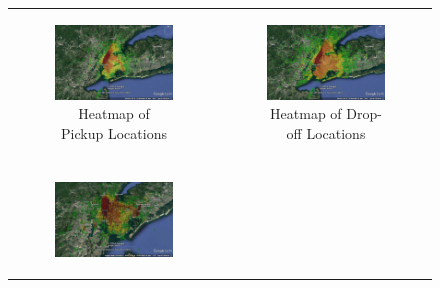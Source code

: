 \documentclass{article}
\begin{document}
\begin{figure}

\begin{tabular}{cc}

\begin{subfigure}{.5\linewidth}
  \centering
  \includegraphics[width=.8\linewidth]{pickup_overhead.jpg}
  \caption{Heatmap of Pickup Locations}
  \label{sub:pu_oh}
\end{subfigure} & 
\begin{subfigure}{.5\linewidth}
  \centering
  \includegraphics[width=.8\linewidth]{dropoff_overhead.jpg}
  \caption{Heatmap of Drop-off Locations}
  \label{sub:do_oh}
\end{subfigure} \\\\
\begin{subfigure}{.5\linewidth}
  \centering
  \includegraphics[width=.8\linewidth]{pickup_ne.jpg}

\end{subfigure}
\end{tabular}
\end{figure}
\end{document}
